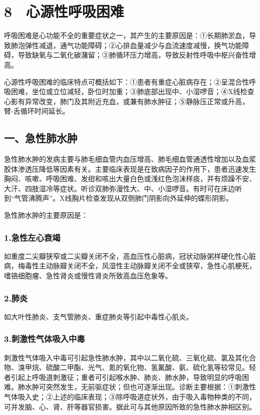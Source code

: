 \protect\hypertarget{text00051.html}{}{}

\section{8　心源性呼吸困难}

呼吸困难是心功能不全的重要症状之一，其产生的主要原因是：①长期肺淤血，导致肺泡弹性减退，通气功能障碍；②心排血量减少与血流速度减慢，换气功能障碍，导致缺氧与二氧化碳潴留；③肺循环压力增高，导致反射性呼吸中枢兴奋性增高。

心源性呼吸困难的临床特点可概括如下：①患者有重症心脏病存在；②呈混合性呼吸困难，坐位或立位减轻，卧位时加重；③肺底部出现中、小湿啰音；④X线检查心影有异常改变，肺门及其附近充血，或兼有肺水肿征；⑤静脉压正常或升高，臂-舌循环时间延长。

\subsection{一、急性肺水肿}

急性肺水肿的发病主要与肺毛细血管内血压增高、肺毛细血管通透性增加以及血浆胶体渗透压降低等因素有关。主要临床表现是在致病因子的作用下，患者迅速发生胸闷、咳嗽、呼吸困难、发绀和咳出大量白色或浅红色泡沫样痰，并有烦躁不安、大汗、四肢湿冷等症状。听诊双肺弥漫性大、中、小湿啰音。有时可在床边听到“气管沸腾声”。X线胸片检查发现从双侧肺门阴影向外延伸的蝶形阴影。

急性肺水肿的主要原因是：

\subsubsection{1.急性左心衰竭}

如重度二尖瓣狭窄或二尖瓣关闭不全，高血压性心脏病，冠状动脉粥样硬化性心脏病，梅毒性主动脉瓣关闭不全，风湿性主动脉瓣关闭不全或狭窄，急性心肌梗死，嗜铬细胞瘤、急性肾炎或慢性肾炎所致高血压危象等。

\subsubsection{2.肺炎}

如大叶性肺炎、支气管肺炎、重症肺炎等引起中毒性心肌炎。

\subsubsection{3.刺激性气体吸入中毒}

刺激性气体吸入中毒可引起急性肺水肿，其中以二氧化硫、三氧化硫、氯及其化合物、溴甲烷、硫酸二甲酯、光气、氮的氧化物、氢氟酸、氨、硫化氢等较常见。轻者引起上呼吸道刺激征；重者可引起喉水肿、肺炎、肺水肿，导致明显的呼吸困难。肺水肿可突然发生，无前驱症状；但也可逐渐出现。诊断主要根据：①刺激性气体吸入史；②上述的临床表现；③除呼吸道症状外，由于吸入毒物种类的不同，可并发脑、心、肾、肝等器官损害。据此可与其他原因所致的急性肺水肿相区别。

